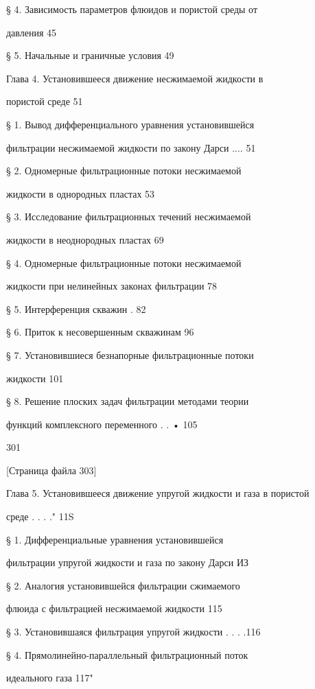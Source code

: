 \documentclass[
  11pt,
]{article}
\begin{document}
§ 4. Зависимость параметров флюидов и пористой среды от \par
давления 45 \par
§ 5. Начальные и граничные условия 49 \par
Глава 4. Установившееся движение несжимаемой жидкости в  \par
пористой среде 51 \par
§ 1. Вывод дифференциального уравнения установившейся \par
фильтрации несжимаемой жидкости по закону Дарси .... 51 \par
§ 2. Одномерные фильтрационные потоки несжимаемой  \par
жидкости в однородных пластах 53 \par
§ 3. Исследование фильтрационных течений несжимаемой \par
жидкости в неоднородных пластах 69 \par
§ 4. Одномерные фильтрационные потоки несжимаемой  \par
жидкости при нелинейных законах фильтрации 78 \par
§ 5. Интерференция скважин . 82 \par
§ 6. Приток к несовершенным скважинам 96 \par
§ 7. Установившиеся безнапорные фильтрационные потоки \par
жидкости 101 \par
§ 8. Решение плоских задач фильтрации методами теории \par
функций комплексного переменного . . • 105 \par
301 \par
\smallskip
\smallskip
\smallskip
{[}Страница файла 303{]}\par
Глава 5. Установившееся движение упругой жидкости и газа в пористой \par
среде . . . ." 11S \par
§ 1. Дифференциальные уравнения установившейся  \par
фильтрации упругой жидкости и газа по закону Дарси ИЗ \par
§ 2. Аналогия установившейся фильтрации сжимаемого  \par
флюида с фильтрацией несжимаемой жидкости 115 \par
§ 3. Установившаяся фильтрация упругой жидкости . . . .116 \par
§ 4. Прямолинейно-параллельный фильтрационный поток \par
идеального газа 117" \par
\end{document}
